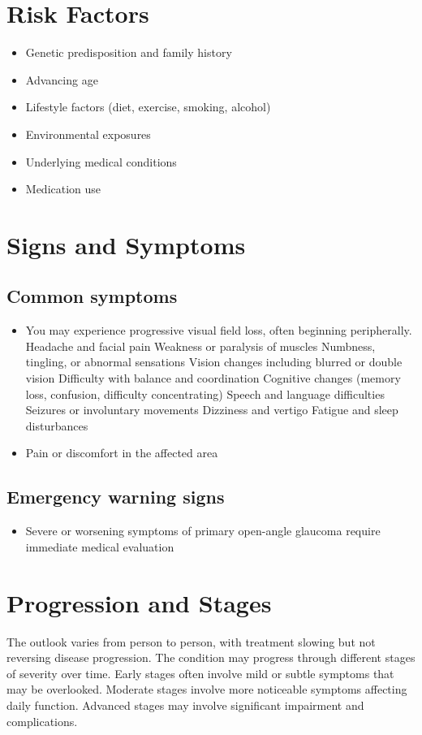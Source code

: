 \section{Risk Factors}
\begin{itemize}[noitemsep]
  \item Genetic predisposition and family history
  \item Advancing age
  \item Lifestyle factors (diet, exercise, smoking, alcohol)
  \item Environmental exposures
  \item Underlying medical conditions
  \item Medication use
\end{itemize}
\section{Signs and Symptoms}

\subsection{Common symptoms}
\begin{itemize}[noitemsep]
  \item You may experience progressive visual field loss, often beginning peripherally. Headache and facial pain Weakness or paralysis of muscles Numbness, tingling, or abnormal sensations Vision changes including blurred or double vision Difficulty with balance and coordination Cognitive changes (memory loss, confusion, difficulty concentrating) Speech and language difficulties Seizures or involuntary movements Dizziness and vertigo Fatigue and sleep disturbances
  \item Pain or discomfort in the affected area
  \end{itemize}

\subsection{Emergency warning signs}
\begin{itemize}[noitemsep]
  \item Severe or worsening symptoms of primary open-angle glaucoma require immediate medical evaluation
\end{itemize}
\section{Progression and Stages}
The outlook varies from person to person, with treatment slowing but not reversing disease progression. The condition may progress through different stages of severity over time. Early stages often involve mild or subtle symptoms that may be overlooked. Moderate stages involve more noticeable symptoms affecting daily function. Advanced stages may involve significant impairment and complications.
